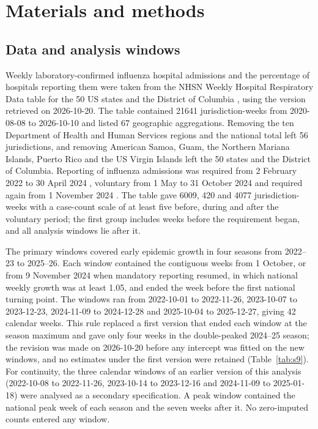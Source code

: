 \section{Materials and methods}
\label{sec:methods}

\subsection{Data and analysis windows}
\label{sec:meth-data}

Weekly laboratory-confirmed influenza hospital admissions and the percentage of hospitals reporting them were taken from the NHSN Weekly Hospital Respiratory Data table for the 50 US states and the District of Columbia \citep{cdc2026nhsn}, using the version retrieved on 2026-10-20. The table contained 21641 jurisdiction-weeks from 2020-08-08 to 2026-10-10 and listed 67 geographic aggregations. Removing the ten Department of Health and Human Services regions and the national total left 56 jurisdictions, and removing American Samoa, Guam, the Northern Mariana Islands, Puerto Rico and the US Virgin Islands left the 50 states and the District of Columbia. Reporting of influenza admissions was required from 2 February 2022 to 30 April 2024 \citep{cdc2022flusight, frutos2025evaluation}, voluntary from 1 May to 31 October 2024 and required again from 1 November 2024 \citep{cms2024reporting}. The table gave 6009, 420 and 4077 jurisdiction-weeks with a case-count scale of at least five before, during and after the voluntary period; the first group includes weeks before the requirement began, and all analysis windows lie after it.

The primary windows covered early epidemic growth in four seasons from 2022--23 to 2025--26. Each window contained the contiguous weeks from 1 October, or from 9 November 2024 when mandatory reporting resumed, in which national weekly growth was at least 1.05, and ended the week before the first national turning point. The windows ran from 2022-10-01 to 2022-11-26, 2023-10-07 to 2023-12-23, 2024-11-09 to 2024-12-28 and 2025-10-04 to 2025-12-27, giving 42 calendar weeks. This rule replaced a first version that ended each window at the season maximum and gave only four weeks in the double-peaked 2024--25 season; the revision was made on 2026-10-20 before any intercept was fitted on the new windows, and no estimates under the first version were retained (Table~\ref{tab:s9}). For continuity, the three calendar windows of an earlier version of this analysis (2022-10-08 to 2022-11-26, 2023-10-14 to 2023-12-16 and 2024-11-09 to 2025-01-18) were analysed as a secondary specification. A peak window contained the national peak week of each season and the seven weeks after it. No zero-imputed counts entered any window.

